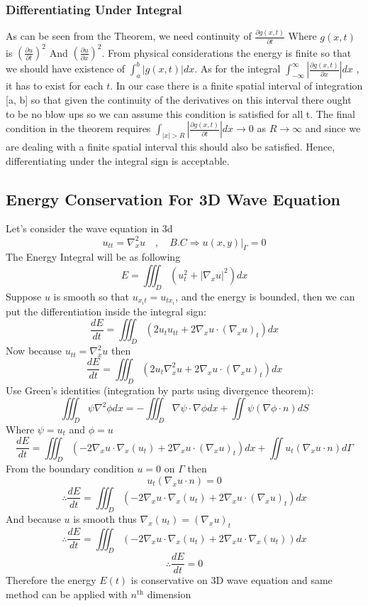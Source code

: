\subsubsection*{Differentiating Under Integral}
As can be seen from the Theorem, we need continuity of 
$\displaystyle \frac{\partial g(x, t)}{\partial t}$
Where $g(x,t)$ is 
$\displaystyle {\left(\frac{\partial u}{\partial t}\right)}^2$
And
$\displaystyle {\left(\frac{\partial u}{\partial x}\right)}^2$. 
From physical considerations the energy is finite so that we should have existence of
$\displaystyle \int_{a}^{b} |g(x,t)|dx$. As for the integral
$\displaystyle \int_{-\infty}^{\infty} \left|\frac{\partial g(x,t)}{\partial x}\right|dx$
, it has to exist for each $t$. In our case there is a finite spatial interval of integration
[a, b] so that given the continuity of the derivatives on this interval there ought
to be no blow ups so we can assume this condition is satisfied for all t. 
The final condition in the theorem requires
$\displaystyle \int_{|x|>R} |\frac{\partial g(x,t)}{\partial t}| dx \to 0 $ as $R \to \infty$
and since we are dealing with a finite spatial interval this should also be satisfied.
Hence, differentiating under the integral sign is acceptable.

\subsection{Energy Conservation For 3D Wave Equation}
Let's consider the wave equation in 3d
\[
u_{tt} = \nabla_x^2 u \quad,\quad B.C \Longrightarrow  u(x,y)|_\Gamma = 0
\]
The Energy Integral will be as following
\[
    E = \iiint_{D}(u_t^2 + |\nabla_x u|^2) dx
\]
Suppose $u$ is smooth so that $u_{x_{i}t}=u_{t x_{i}}$, 
and the energy is bounded, then we can put the differentiation inside the integral sign:
\[
\frac{dE}{dt} = \iiint_{D}(  2 u_t u_{tt} + 2 \nabla_x u \cdot (\nabla_x u)_t) dx
\]
Now because $u_{tt} = \nabla_x^2 u$ then
\[
    \frac{dE}{dt} = \iiint_{D}(  2 u_t \nabla_x^2 u + 2 \nabla_x u \cdot (\nabla_x u)_t) dx
\]
Use Green's identities (integration by parts using divergence theorem):
\[
    \iiint_{D} \psi \nabla^2 \phi dx = -\iiint_{D} \nabla \psi \cdot \nabla \phi dx + \iint \psi (\nabla \phi \cdot n )dS
\]
Where $\psi = u_t $ and  $\phi = u$
\[
    \frac{dE}{dt} = \iiint_{D}( -2 \nabla_x u \cdot \nabla_x (u_t) + 2\nabla_x u \cdot (\nabla_x u)_t) dx  + \iint u_t(\nabla_x u \cdot n )d\Gamma
\]
From the boundary condition $u=0$ on $\Gamma$ then 
\[
    u_t(\nabla_x u \cdot n ) = 0
\]
\[
  \therefore  \frac{dE}{dt} = \iiint_{D}( -2 \nabla_x u \cdot \nabla_x (u_t) + 2\nabla_x u \cdot (\nabla_x u)_t) dx
\]
And because $u$ is smooth thus $\nabla_x (u_t) =(\nabla_x u)_t$
\[
  \therefore  \frac{dE}{dt} = \iiint_{D}( -2 \nabla_x u \cdot \nabla_x (u_t) + 2 \nabla_x u \cdot \nabla_x (u_t)) dx
\]
\[
    \therefore  \frac{dE}{dt} = 0
\]
Therefore the energy $E(t)$ is conservative on 3D wave equation and same method can be applied with 
$n^{\text{th}}$ dimension 